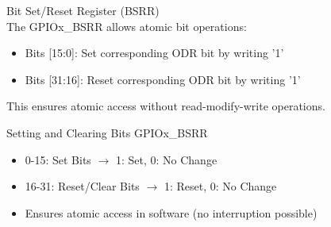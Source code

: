 \begin{definition}{Bit Set/Reset Register (BSRR)}\\
The GPIOx\_BSRR allows atomic bit operations:
\begin{itemize}
    \item Bits [15:0]: Set corresponding ODR bit by writing '1'
    \item Bits [31:16]: Reset corresponding ODR bit by writing '1'
\end{itemize}
This ensures atomic access without read-modify-write operations.
\end{definition}

\begin{KR}{Setting and Clearing Bits} GPIOx\_BSRR
    \begin{itemize}
        \item 0-15: Set Bits $\rightarrow$ 1: Set, 0: No Change
        \item 16-31: Reset/Clear Bits $\rightarrow$ 1: Reset, 0: No Change
        \item Ensures atomic access in software (no interruption possible)
    \end{itemize}
\end{KR}

